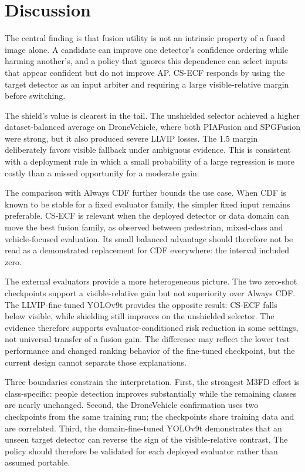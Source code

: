\documentclass[preprint,11pt]{elsarticle}
\begin{document}
\section{Discussion}

The central finding is that fusion utility is not an intrinsic property of a
fused image alone. A candidate can improve one detector's confidence ordering
while harming another's, and a policy that ignores this dependence can select
inputs that appear confident but do not improve AP. CS-ECF responds by using
the target detector as an input arbiter and requiring a large visible-relative
margin before switching.

The shield's value is clearest in the tail. The unshielded selector achieved a
higher dataset-balanced average on DroneVehicle, where both PIAFusion and
SPGFusion were strong, but it also produced severe LLVIP losses. The 1.5 margin
deliberately favors visible fallback under ambiguous evidence. This is
consistent with a deployment rule in which a small probability of a large
regression is more costly than a missed opportunity for a moderate gain.

The comparison with Always CDF further bounds the use case. When CDF is known
to be stable for a fixed evaluator family, the simpler fixed input remains
preferable. CS-ECF is relevant when the deployed detector or data domain can
move the best fusion family, as observed between pedestrian, mixed-class and
vehicle-focused evaluation. Its small balanced advantage should therefore not
be read as a demonstrated replacement for CDF everywhere: the interval
included zero.

The external evaluators provide a more heterogeneous picture. The two zero-shot
checkpoints support a visible-relative gain but not superiority over Always CDF.
The LLVIP-fine-tuned YOLOv9t provides the opposite result: CS-ECF falls below
visible, while shielding still improves on the unshielded selector. The evidence
therefore supports evaluator-conditioned risk reduction in some settings, not
universal transfer of a fusion gain. The difference may reflect the lower test
performance and changed ranking behavior of the fine-tuned checkpoint, but the
current design cannot separate those explanations.

Three boundaries constrain the interpretation. First, the strongest M3FD effect
is class-specific: people detection improves substantially while the remaining
classes are nearly unchanged. Second, the DroneVehicle confirmation uses two
checkpoints from the same training run; the checkpoints share training data and
are correlated. Third, the domain-fine-tuned YOLOv9t demonstrates that an
unseen target detector can reverse the sign of the visible-relative contrast.
The policy should therefore be validated for each deployed evaluator rather
than assumed portable.
\end{document}
